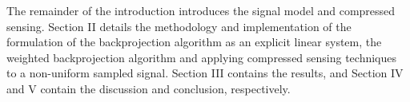 \documentclass[conference]{IEEEtran}
\begin{document}
The remainder of the introduction introduces the signal model and compressed sensing. Section II details the methodology and implementation of the formulation of the backprojection algorithm as an explicit linear system, the weighted backprojection algorithm and applying compressed sensing techniques to a non-uniform sampled signal. Section III contains the results, and Section IV and V contain the discussion and conclusion, respectively.






\end{document}

